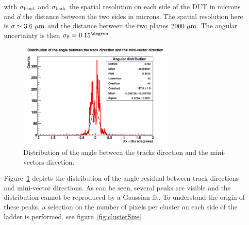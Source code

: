    with $\sigma_{\rm{front}}$ and $\sigma_{\rm{back}}$ the spatial resolution on each side of the \gls{DUT} in microns and $d$ the distance between the two sides in microns.
   The spatial resolution here is $\sigma \simeq 3.6~\rm{\mu m}$ and the distance between the two planes $2000~\rm{\mu m}$.
   The angular uncertainty is then $\sigma_{\theta} = 0.15^{\degree}$.  
   
   \begin{figure}[!tbh]
     \centering
     \includegraphics[width = 0.7\textwidth]{Pictures/deformation/hDiffAngleX_226056.png}
     \caption{Distribution of the angle between the tracks direction and the mini-vectors direction.}
     \label{fig:angRes}
   \end{figure}

   Figure~\ref{fig:angRes} depicts the distribution of the angle residual between track directions and mini-vector directions.
   As can be seen, several peaks are visible and the distribution cannot be reproduced by a Gaussian fit.
   To understand the origin of these peaks, a selection on the number of pixels per cluster on each side of the ladder is performed, see figure~\ref{fig:clusterSize}.
   
